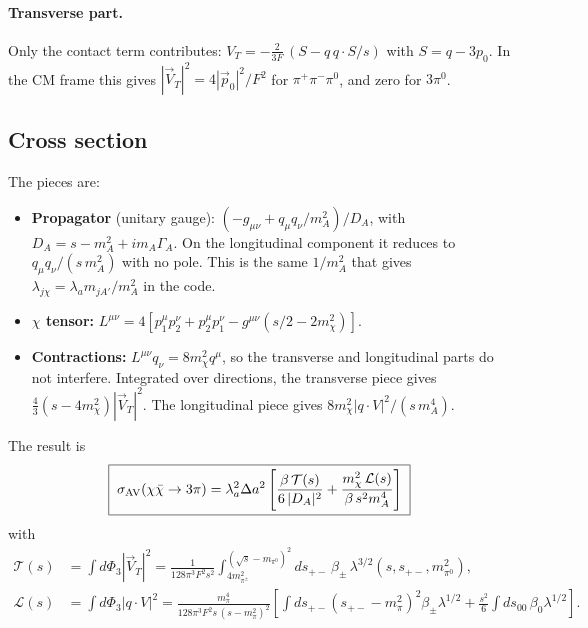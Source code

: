 \documentclass{article}
\newcommand{\spm}{s_{+-}}
\newcommand{\mpi}{m_\pi}
\newcommand{\Da}{\Delta a}
\newcommand{\lam}{\lambda^{1/2}}
\begin{document}
\paragraph{Transverse part.}
Only the contact term contributes:
$V_T=-\tfrac{2}{3F}\,(S-q\,q\!\cdot\!S/s)$ with $S=q-3p_0$. In the CM frame this gives
$|\vec V_T|^2=4|\vec p_0|^2/F^2$ for $\pi^+\pi^-\pi^0$, and zero for $3\pi^0$.

\subsection{Cross section}

The pieces are:
\begin{itemize}
\item \textbf{Propagator} (unitary gauge): $(-g_{\mu\nu}+q_\mu q_\nu/m_A^2)/D_A$, with
  $D_A=s-m_A^2+im_A\Gamma_A$. On the longitudinal component it reduces to $q_\mu q_\nu/(s\,m_A^2)$
  with no pole. This is the same $1/m_A^2$ that gives
  $\lambda_{j\chi}=\lambda_am_{jA'}/m_A^2$ in the code.
\item \textbf{$\chi$ tensor:}
  $L^{\mu\nu}=4[p_1^\mu p_2^\nu+p_2^\mu p_1^\nu-g^{\mu\nu}(s/2-2m_\chi^2)]$.
\item \textbf{Contractions:} $L^{\mu\nu}q_\nu=8m_\chi^2q^\mu$, so the transverse and longitudinal
  parts do not interfere. Integrated over directions, the transverse piece gives
  $\tfrac43(s-4m_\chi^2)|\vec V_T|^2$. The longitudinal piece gives
  $8m_\chi^2|q\cdot V|^2/(s\,m_A^4)$.
\end{itemize}
The result is
\begin{equation}
  \boxed{\;\sigma_{\rm AV}(\chi\bar\chi\to3\pi)=\lambda_a^2\Da^2\left[
  \frac{\beta\,\mathcal T(s)}{6\,|D_A|^2}+\frac{m_\chi^2\,\mathcal L(s)}{\beta\,s^2m_A^4}\right]\;}
\end{equation}
with
\begin{align}
  \mathcal T(s)&=\int d\Phi_3|\vec V_T|^2=\frac{1}{128\pi^3F^2s^2}
   \int_{4m_{\pi^\pm}^2}^{(\sqrt s-m_{\pi^0})^2}\!\!d\spm\,\beta_\pm\,\lambda^{3/2}(s,\spm,m_{\pi^0}^2),\\
  \mathcal L(s)&=\int d\Phi_3|q\cdot V|^2=\frac{\mpi^4}{128\pi^3F^2s\,(s-\mpi^2)^2}
   \left[\int\!d\spm(\spm-\mpi^2)^2\beta_\pm\lam+\frac{s^2}{6}\int\!ds_{00}\,\beta_0\lam\right].
\end{align}
\end{document}
